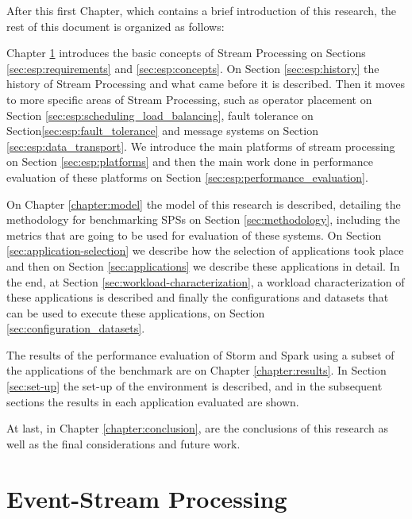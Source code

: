 \documentclass[ppgc,diss,english]{iiufrgs}
\begin{document}
After this first Chapter, which contains a brief introduction of this research, the rest of this document is organized as follows:

Chapter \ref{chapter:event-stream-processing} introduces the basic concepts of Stream Processing on Sections \ref{sec:esp:requirements} and \ref{sec:esp:concepts}. On Section \ref{sec:esp:history} the history of Stream Processing and what came before it is described. Then it moves to more specific areas of Stream Processing, such as operator placement on Section \ref{sec:esp:scheduling_load_balancing}, fault tolerance on Section\ref{sec:esp:fault_tolerance} and message systems on Section \ref{sec:esp:data_transport}. We introduce the main platforms of stream processing on Section \ref{sec:esp:platforms} and then the main work done in performance evaluation of these platforms on Section \ref{sec:esp:performance_evaluation}.

On Chapter \ref{chapter:model} the model of this research is described, detailing the methodology for benchmarking SPSs on Section \ref{sec:methodology}, including the metrics that are going to be used for evaluation of these systems. On Section \ref{sec:application-selection} we describe how the selection of applications took place and then on Section \ref{sec:applications} we describe these applications in detail. In the end, at Section \ref{sec:workload-characterization}, a workload characterization of these applications is described and finally the configurations and datasets that can be used to execute these applications, on Section \ref{sec:configuration_datasets}.

The results of the performance evaluation of Storm and Spark using a subset of the applications of the benchmark are on Chapter \ref{chapter:results}. In Section \ref{sec:set-up} the set-up of the environment is described, and in the subsequent sections the results in each application evaluated are shown.

At last, in Chapter \ref{chapter:conclusion}, are the conclusions of this research as well as the final considerations and future work.

\chapter{Event-Stream Processing}
\label{chapter:event-stream-processing}
\end{document}
